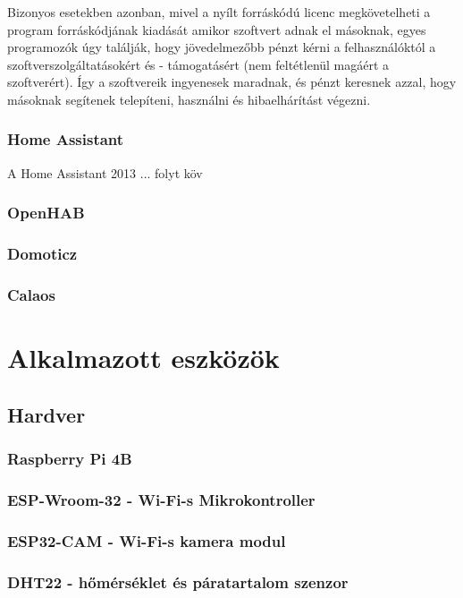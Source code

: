 \documentclass[
]{thesis-ekf}
\theoremstyle{definition}
\theoremstyle{remark}
\begin{document}
	Bizonyos esetekben azonban, mivel a nyílt forráskódú licenc megkövetelheti a program forráskódjának kiadását amikor szoftvert adnak el másoknak, egyes programozók úgy találják, hogy jövedelmezőbb pénzt kérni a felhasználóktól a szoftverszolgáltatásokért és - támogatásért (nem feltétlenül magáért a szoftverért). Így a szoftvereik ingyenesek maradnak, és pénzt keresnek azzal, hogy másoknak segítenek telepíteni, használni és hibaelhárítást végezni.
	
	\subsection*{Home Assistant}
	
	A Home Assistant 2013 ... folyt köv
	
	\subsection*{OpenHAB}
	
	\subsection*{Domoticz}
	
	\subsection*{Calaos}
	\chapter{Alkalmazott eszközök}
	\section{Hardver}
	\subsection{Raspberry Pi 4B}
	\subsection{ESP-Wroom-32 - Wi-Fi-s Mikrokontroller}
	\subsection{ESP32-CAM - Wi-Fi-s kamera modul}
	\subsection{DHT22 - hőmérséklet és páratartalom szenzor}
\end{document}
